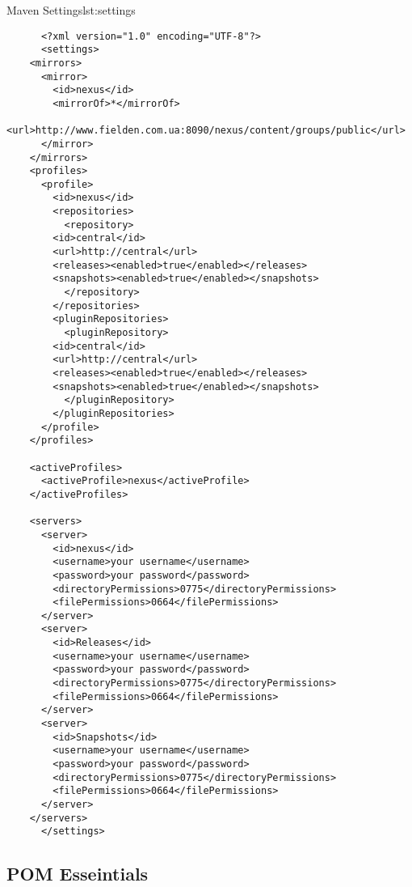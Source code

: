   \begin{code}{Maven Settings}{lst:settings}
    \begin{lstlisting}
      <?xml version="1.0" encoding="UTF-8"?>
      <settings>
	<mirrors>
	  <mirror>
	    <id>nexus</id>
	    <mirrorOf>*</mirrorOf>
	    <url>http://www.fielden.com.ua:8090/nexus/content/groups/public</url>
	  </mirror>
	</mirrors>
	<profiles>
	  <profile>
	    <id>nexus</id>
	    <repositories>
	      <repository>
		<id>central</id>
		<url>http://central</url>
		<releases><enabled>true</enabled></releases>
		<snapshots><enabled>true</enabled></snapshots>
	      </repository>
	    </repositories>
	    <pluginRepositories>
	      <pluginRepository>
		<id>central</id>
		<url>http://central</url>
		<releases><enabled>true</enabled></releases>
		<snapshots><enabled>true</enabled></snapshots>
	      </pluginRepository>
	    </pluginRepositories>
	  </profile>
	</profiles>

	<activeProfiles>
	  <activeProfile>nexus</activeProfile>
	</activeProfiles>

	<servers>
	  <server>
	    <id>nexus</id>
	    <username>your username</username>
	    <password>your password</password>
	    <directoryPermissions>0775</directoryPermissions>
	    <filePermissions>0664</filePermissions>
	  </server>
	  <server>
	    <id>Releases</id>
	    <username>your username</username>
	    <password>your password</password>
	    <directoryPermissions>0775</directoryPermissions>
	    <filePermissions>0664</filePermissions>
	  </server>
	  <server>
	    <id>Snapshots</id>
	    <username>your username</username>
	    <password>your password</password>
	    <directoryPermissions>0775</directoryPermissions>
	    <filePermissions>0664</filePermissions>
	  </server>
	</servers>
      </settings>
    \end{lstlisting}
  \end{code}


  \subsection*{POM Esseintials}  

